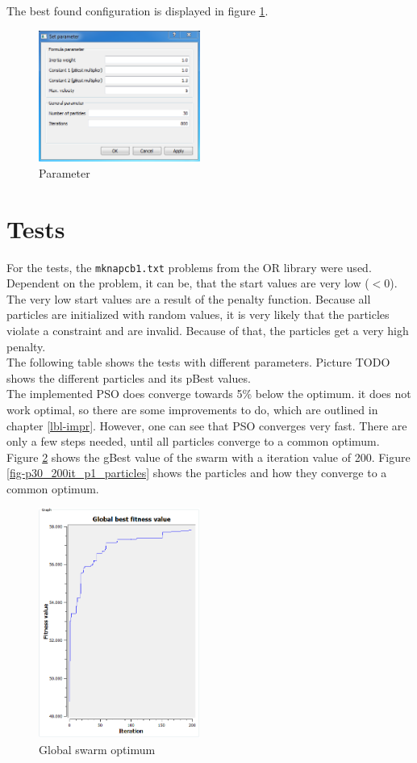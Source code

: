 \documentclass{article}
\begin{document}
The best found configuration is displayed in figure \ref{fig-param}.

\begin{figure}[H]
    \centering
    \includegraphics[width=200px]{images/parameter.PNG}
    \caption{Parameter}
    \label{fig-param}
\end{figure}

\section{Tests}
\label{lbl-tests}
For the tests, the \lstinline$mknapcb1.txt$ problems from the OR library were used. \\
Dependent on the problem, it can be, that the start values are very low ($< 0$). The very low start values are a result of the penalty function. Because all particles are initialized with random values, it is very likely that the particles violate a constraint and are invalid. Because of that, the particles get a very high penalty.\\

The following table shows the tests with different parameters.
Picture TODO shows the different particles and its pBest values.\\

The implemented PSO does converge towards 5\% below the optimum. it does not work optimal, so there are some improvements to do, which are outlined in chapter \ref{lbl-impr}. However, one can see that PSO converges very fast. There are only a few steps needed, until all particles converge to a common optimum. Figure \ref{fig-p30_200it_p1} shows the gBest value of the swarm with a iteration value of 200. Figure \ref{fig-p30_200it_p1_particles} shows the particles and how they converge to a common optimum.

\begin{figure}[H]
    \centering
    \includegraphics[width=200px]{images/p30_200it_p1.PNG}
    \caption{Global swarm optimum}
    \label{fig-p30_200it_p1}
\end{figure}
\end{document}
